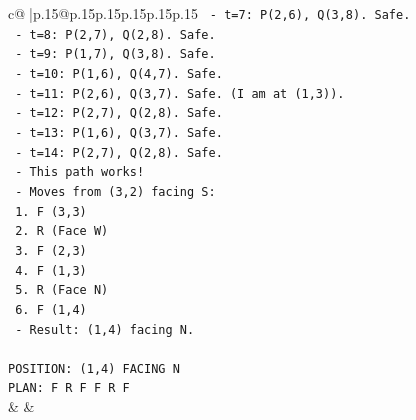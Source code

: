 \documentclass{article}
\begin{document}
{\begin{supertabular}{c@{$\;$}|p{.15\linewidth}@{}p{.15\linewidth}p{.15\linewidth}p{.15\linewidth}p{.15\linewidth}p{.15\linewidth}}
{{{\texttt{        {-} t=7: P(2,6), Q(3,8). Safe.} \\
\texttt{        {-} t=8: P(2,7), Q(2,8). Safe.} \\
\texttt{        {-} t=9: P(1,7), Q(3,8). Safe.} \\
\texttt{        {-} t=10: P(1,6), Q(4,7). Safe.} \\
\texttt{        {-} t=11: P(2,6), Q(3,7). Safe. (I am at (1,3)).} \\
\texttt{        {-} t=12: P(2,7), Q(2,8). Safe.} \\
\texttt{        {-} t=13: P(1,6), Q(3,7). Safe.} \\
\texttt{        {-} t=14: P(2,7), Q(2,8). Safe.} \\
\texttt{      {-} This path works!} \\
\texttt{      {-} Moves from (3,2) facing S:} \\
\texttt{        1. F (3,3)} \\
\texttt{        2. R (Face W)} \\
\texttt{        3. F (2,3)} \\
\texttt{        4. F (1,3)} \\
\texttt{        5. R (Face N)} \\
\texttt{        6. F (1,4)} \\
\texttt{      {-} Result: (1,4) facing N.} \\
\\ 
\texttt{POSITION: (1,4) FACING N} \\
\texttt{PLAN: F R F F R F} \\
            }
        }
    }
    & & \\ \\


\end{supertabular}}
\end{document}
